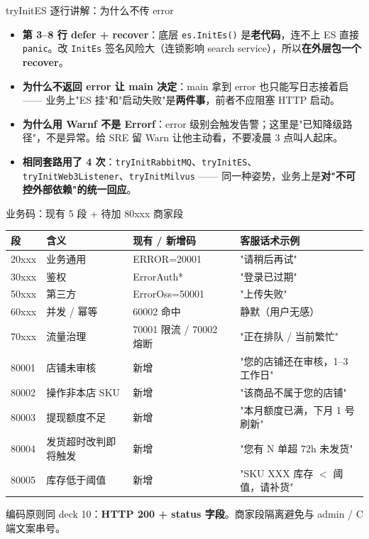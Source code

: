 \documentclass[aspectratio=169,11pt]{beamer}
\begin{document}
\begin{frame}[shrink]{tryInitES 逐行讲解：为什么不传 error}
\begin{itemize}
  \item \textbf{第 3--8 行 defer + recover}：底层 \texttt{es.InitEs()} 是\textbf{老代码}，连不上 ES 直接 \texttt{panic}。改 \texttt{InitEs} 签名风险大（连锁影响 search service），所以\textbf{在外层包一个 recover}。
  \item \textbf{为什么不返回 error 让 main 决定}：main 拿到 error 也只能写日志接着启 —— 业务上"ES 挂"和"启动失败"是\textbf{两件事}，前者不应阻塞 HTTP 启动。
  \item \textbf{为什么用 Warnf 不是 Errorf}：error 级别会触发告警；这里是"已知降级路径"，不是异常。给 SRE 留 Warn 让他主动看，不要凌晨 3 点叫人起床。
  \item \textbf{相同套路用了 4 次}：\texttt{tryInitRabbitMQ}、\texttt{tryInitES}、\texttt{tryInitWeb3Listener}、\texttt{tryInitMilvus} —— 同一种姿势，业务上是\textbf{对"不可控外部依赖"的统一回应}。
\end{itemize}
\end{frame}

\begin{frame}[shrink]{业务码：现有 5 段 + 待加 80xxx 商家段}
\scriptsize
\begin{tabular}{@{}llll@{}}
\toprule
段 & 含义 & 现有 / 新增码 & 客服话术示例 \\
\midrule
20xxx & 业务通用 & ERROR=20001       & "请稍后再试" \\
30xxx & 鉴权     & ErrorAuth*        & "登录已过期" \\
50xxx & 第三方   & ErrorOss=50001    & "上传失败" \\
60xxx & 并发 / 幂等 & 60002 命中     & 静默（用户无感）\\
70xxx & 流量治理 & 70001 限流 / 70002 熔断 & "正在排队 / 当前繁忙" \\
\midrule
80001 & 店铺未审核     & 新增 & "您的店铺还在审核，1--3 工作日" \\
80002 & 操作非本店 SKU & 新增 & "该商品不属于您的店铺" \\
80003 & 提现额度不足   & 新增 & "本月额度已满，下月 1 号刷新" \\
80004 & 发货超时改判即将触发 & 新增 & "您有 N 单超 72h 未发货" \\
80005 & 库存低于阈值   & 新增 & "SKU XXX 库存 $<$ 阈值，请补货" \\
\bottomrule
\end{tabular}
\vspace{1mm}
\small 编码原则同 deck 10：\textbf{HTTP 200 + status 字段}。商家段隔离避免与 admin / C 端文案串号。
\end{frame}
\end{document}
